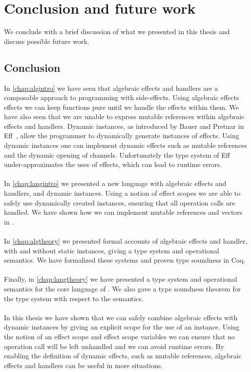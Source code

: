 \chapter{\label{chap:conclusion}Conclusion and future work}

We conclude with a brief discussion of what we presented in this thesis and discuss possible future work.

\section{Conclusion}
In \cref{chap:algintro} we have seen that algebraic effects and handlers are a composable approach to programming with side-effects.
Using algebraic effects effects we can keep functions pure until we handle the effects within them.
We have also seen that we are unable to express mutable references within algebraic effects and handlers.
Dynamic instances, as introduced by Bauer and Pretnar in Eff~\autocite{eff1}, allow the programmer to dynamically generate instances of effects.
Using dynamic instances one can implement dynamic effects such as mutable references and the dynamic opening of channels.
Unfortunately the type system of Eff under-approximates the uses of effects, which can lead to runtime errors.
\\\\
In \cref{chap:langintro} we presented a new language \lang{} with algebraic effects and handlers, and dynamic instances.
Using a notion of effect scopes we are able to safely use dynamically created instances, ensuring that all operation calls are handled.
We have shown how we can implement mutable references and vectors in \lang{}.
\\\\
In \cref{chap:algtheory} we presented formal accounts of algebraic effects and handler, with and without static instances, giving a type system and operational semantics.
We have formalized these systems and proven type soundness in Coq.
\\\\
Finally, in \cref{chap:langtheory} we have presented a type system and operational semantics for the core language of \lang{}.
We also gave a type soundness theorem for the type system with respect to the semantics.
\\\\
In this thesis we have shown that we can safely combine algebraic effects with dynamic instances by giving an explicit scope for the use of an instance.
Using the notion of an effect scope and effect scope variables we can ensure that no operation call will be left unhandled and we can avoid runtime errors.
By enabling the definition of dynamic effects, such as mutable references, algebraic effects and handlers can be useful in more situations.
 
